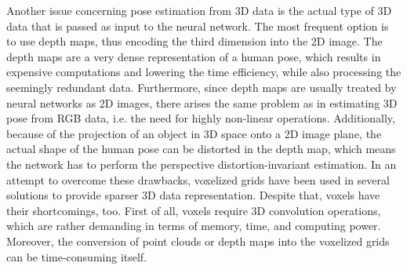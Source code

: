 \par
\vspace{5mm}
\noindent Another issue concerning pose estimation from 3D data is the actual type of 3D data that is passed as input to the neural network. The most frequent option is to use depth maps, thus encoding the third dimension into the 2D image. The depth maps are a very dense representation of a human pose, which results in expensive computations and lowering the time efficiency, while also processing the seemingly redundant data. Furthermore, since depth maps are usually treated by neural networks as 2D images, there arises the same problem as in estimating 3D pose from RGB data, i.e. the need for highly non-linear operations. Additionally, because of the projection of an object in 3D space onto a 2D image plane, the actual shape of the human pose can be distorted in the depth map, which means the network has to perform the perspective distortion-invariant estimation. In an attempt to overcome these drawbacks, voxelized grids have been used in several solutions to provide sparser 3D data representation. Despite that, voxels have their shortcomings, too. First of all, voxels require 3D convolution operations, which are rather demanding in terms of memory, time, and computing power. Moreover, the conversion of point clouds or depth maps into the voxelized grids can be time-consuming itself.\par
\vspace{5mm}


